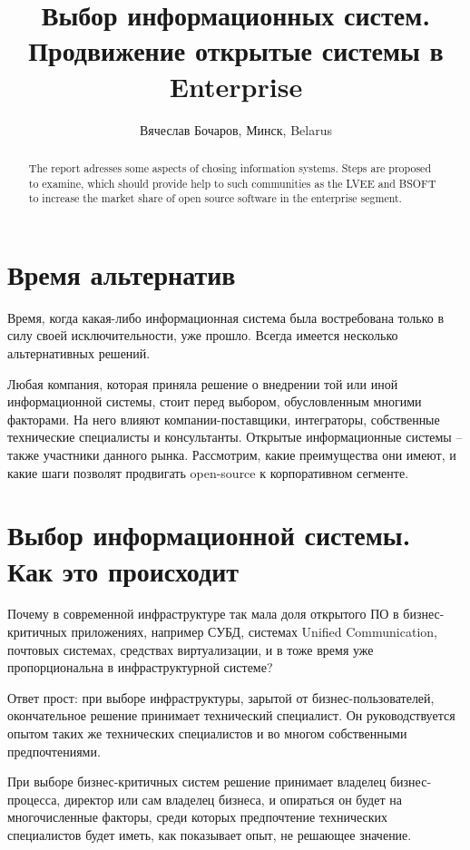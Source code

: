 \documentclass[10pt, a5paper]{article}
\begin{document}
\title{Выбор информационных систем. Продвижение открытые системы в Enterprise}
\author{Вячеслав Бочаров, Минск, Belarus}
\maketitle
\begin{abstract}
The report adresses some aspects of chosing information systems. Steps are proposed to examine, which should provide help to such communities as the LVEE and BSOFT to increase the market share of open source software in the enterprise segment.
\end{abstract}
\section*{Время альтернатив}

Время, когда какая-либо информационная система была востребована только в силу своей исключительности, уже прошло. 
Всегда имеется несколько альтернативных решений.

Любая компания, которая приняла решение о внедрении той или иной информационной системы, стоит перед выбором, обусловленным многими факторами. На него влияют компании-поставщики, интеграторы, собственные технические специалисты и консультанты.
Открытые информационные системы -- также участники данного рынка. Рассмотрим, какие преимущества они имеют, и какие шаги позволят продвигать open-source  к корпоративном сегменте.

\section*{Выбор информационной системы. Как это происходит}

Почему в современной инфраструктуре так мала доля открытого ПО в бизнес-критичных приложениях, например СУБД, системах Unified Communication, почтовых системах, средствах виртуализации, и в тоже время уже пропорциональна в инфраструктурной системе?

Ответ прост: при выборе инфраструктуры, зарытой от бизнес-пользователей, окончательное решение принимает технический специалист. Он руководствуется опытом таких же технических специалистов и во многом собственными предпочтениями.

При выборе бизнес-критичных систем решение принимает владелец бизнес-процесса, директор или сам владелец бизнеса, и опираться он будет на многочисленные факторы, среди которых предпочтение технических специалистов будет иметь, как показывает опыт, не решающее значение.
\end{document}
